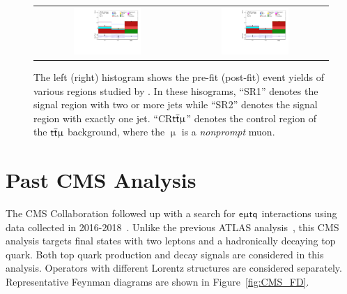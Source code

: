 \begin{figure}[tbh!]
 \begin{center}
 \begin{tabular}{cc}
 \includegraphics[width=0.48\textwidth]{figures/Part3/History/ATLAS_results3}&
 \includegraphics[width=0.48\textwidth]{figures/Part3/History/ATLAS_results4}\\
 \end{tabular}
 \caption{The left (right) histogram shows the pre-fit (post-fit) event yields of various regions studied by \cite{ATLAS-CONF-2023-001}. In these hisograms, ``SR1'' denotes the signal region with two or more jets while ``SR2'' denotes the signal region with exactly one jet. ``CR$\textsf{t}\overline{\textsf{t}}\upmu$'' denotes the control region of the $\textsf{t}\overline{\textsf{t}}\upmu$ background, where the $\upmu$ is a \emph{nonprompt} muon.}
 \label{fig:ATLAS_results2}
 \end{center}
\end{figure}
\section{Past CMS Analysis}
\label{sec:CLFV_CMS}

The \ac{CMS} Collaboration followed up with a search for $\textsf{e}\upmu\textsf{t{q}}$ interactions using data collected in 2016-2018~\cite{CMS:2022ztx}. Unlike the previous \ac{ATLAS} analysis~\cite{ATLAS-CONF-2018-044}, this \ac{CMS} analysis targets final states with two leptons and a hadronically decaying top quark. Both top quark production and decay signals are considered in this analysis. Operators with different Lorentz structures are considered separately. Representative Feynman diagrams are shown in Figure~\ref{fig:CMS_FD}. 

